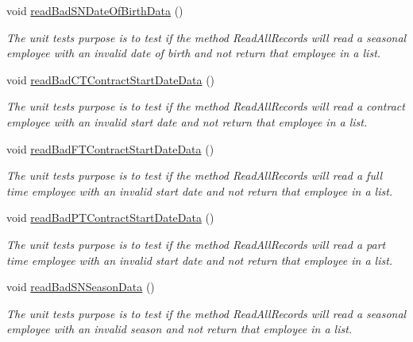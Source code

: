 \begin{DoxyCompactItemize}
void \hyperlink{class_file_i_o_tests_1_1_file_i_o_tests_aaef88f336ac31b90daecef832d40c560}{read\+Bad\+S\+N\+Date\+Of\+Birth\+Data} ()
\begin{DoxyCompactList}\small\item\em The unit test\textquotesingle{}s purpose is to test if the method Read\+All\+Records will read a seasonal employee with an invalid date of birth and not return that employee in a list. \end{DoxyCompactList}\item 
void \hyperlink{class_file_i_o_tests_1_1_file_i_o_tests_a6867a128f3c6430639c6152237d723de}{read\+Bad\+C\+T\+Contract\+Start\+Date\+Data} ()
\begin{DoxyCompactList}\small\item\em The unit test\textquotesingle{}s purpose is to test if the method Read\+All\+Records will read a contract employee with an invalid start date and not return that employee in a list. \end{DoxyCompactList}\item 
void \hyperlink{class_file_i_o_tests_1_1_file_i_o_tests_a8934e2ab8df733979ff977276a9d89ab}{read\+Bad\+F\+T\+Contract\+Start\+Date\+Data} ()
\begin{DoxyCompactList}\small\item\em The unit test\textquotesingle{}s purpose is to test if the method Read\+All\+Records will read a full time employee with an invalid start date and not return that employee in a list. \end{DoxyCompactList}\item 
void \hyperlink{class_file_i_o_tests_1_1_file_i_o_tests_ae61f702c7175f65f4e831873b9baaf2c}{read\+Bad\+P\+T\+Contract\+Start\+Date\+Data} ()
\begin{DoxyCompactList}\small\item\em The unit test\textquotesingle{}s purpose is to test if the method Read\+All\+Records will read a part time employee with an invalid start date and not return that employee in a list. \end{DoxyCompactList}\item 
void \hyperlink{class_file_i_o_tests_1_1_file_i_o_tests_a27a923a5933172ad163f750dcb3c0d97}{read\+Bad\+S\+N\+Season\+Data} ()
\begin{DoxyCompactList}\small\item\em The unit test\textquotesingle{}s purpose is to test if the method Read\+All\+Records will read a seasonal employee with an invalid season and not return that employee in a list. \end{DoxyCompactList}\item 

\end{DoxyCompactItemize}
